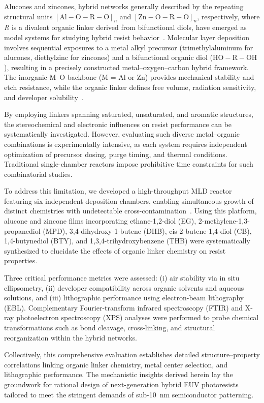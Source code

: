 Alucones and zincones, hybrid networks generally described by the repeating structural units \(\left[\mathrm{Al-O-R-O}\right]_n\) and \(\left[\mathrm{Zn-O-R-O}\right]_n\), respectively, where \textit{R} is a divalent organic linker derived from bifunctional diols, have emerged as model systems for studying hybrid resist behavior~\cite{Choudhury2015,Perrotta2019}. Molecular layer deposition involves sequential exposures to a metal alkyl precursor (trimethylaluminum for alucones, diethylzinc for zincones) and a bifunctional organic diol (\(\mathrm{HO-R-OH}\)), resulting in a precisely constructed metal–oxygen–carbon hybrid framework. The inorganic M–O backbone (M = Al or Zn) provides mechanical stability and etch resistance, while the organic linker defines free volume, radiation sensitivity, and developer solubility~\cite{Vemuri2023,Lee2014}.

By employing linkers spanning saturated, unsaturated, and aromatic structures, the stereochemical and electronic influences on resist performance can be systematically investigated. However, evaluating such diverse metal–organic combinations is experimentally intensive, as each system requires independent optimization of precursor dosing, purge timing, and thermal conditions. Traditional single-chamber reactors impose prohibitive time constraints for such combinatorial studies. 

To address this limitation, we developed a high-throughput MLD reactor featuring six independent deposition chambers, enabling simultaneous growth of distinct chemistries with undetectable cross-contamination~\cite{Choe2024}. Using this platform, alucone and zincone films incorporating ethane-1,2-diol (EG), 2-methylene-1,3-propanediol (MPD), 3,4-dihydroxy-1-butene (DHB), cis-2-butene-1,4-diol (CB), 1,4-butynediol (BTY), and 1,3,4-trihydroxybenzene (THB) were systematically synthesized to elucidate the effects of organic linker chemistry on resist properties.

Three critical performance metrics were assessed: (i) air stability via in situ ellipsometry, (ii) developer compatibility across organic solvents and aqueous solutions, and (iii) lithographic performance using electron-beam lithography (EBL). Complementary Fourier-transform infrared spectroscopy (FTIR) and X-ray photoelectron spectroscopy (XPS) analyses were performed to probe chemical transformations such as bond cleavage, cross-linking, and structural reorganization within the hybrid networks.

Collectively, this comprehensive evaluation establishes detailed structure–property correlations linking organic linker chemistry, metal center selection, and lithographic performance. The mechanistic insights derived herein lay the groundwork for rational design of next-generation hybrid EUV photoresists tailored to meet the stringent demands of sub-\SI{10}{\nano\meter} semiconductor patterning.
